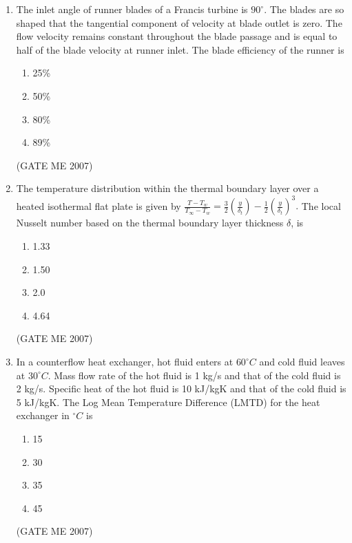 \documentclass[journal]{IEEEtran}
\begin{document}
\begin{enumerate}
\item The inlet angle of runner blades of a Francis turbine is $ 90^\circ $. The blades are so shaped that the tangential component of velocity at blade outlet is zero. The flow velocity remains constant throughout the blade passage and is equal to half of the blade velocity at runner inlet. The blade efficiency of the runner is
\begin{multicols}{4}
\begin{enumerate}
\item 25\%
\item 50\%
\item 80\%
\item 89\%
\end{enumerate}
\end{multicols}
\hfill (GATE ME 2007)

\item The temperature distribution within the thermal boundary layer over a heated isothermal flat plate is given by $\frac{T - T_w}{T_\infty - T_w} = \frac{3}{2} \left( \frac{y}{\delta_t} \right) - \frac{1}{2} \left( \frac{y}{\delta_t} \right)^3.$ The local Nusselt number based on the thermal boundary layer thickness $ \delta $, is
\begin{multicols}{4}
\begin{enumerate}
\item 1.33
\item 1.50
\item 2.0
\item 4.64
\end{enumerate}
\end{multicols}
\hfill (GATE ME 2007)

\item In a counterflow heat exchanger, hot fluid enters at $ 60^\circ C $ and cold fluid leaves at $ 30^\circ C $. Mass flow rate of the hot fluid is 1 kg/s and that of the cold fluid is 2 kg/s. Specific heat of the hot fluid is 10 kJ/kgK and that of the cold fluid is 5 kJ/kgK. The Log Mean Temperature Difference (LMTD) for the heat exchanger in $ ^\circ C $ is
\begin{multicols}{4}
\begin{enumerate}
\item 15
\item 30
\item 35
\item 45
\end{enumerate}
\end{multicols}
\hfill (GATE ME 2007)


\end{enumerate}
\end{document}
